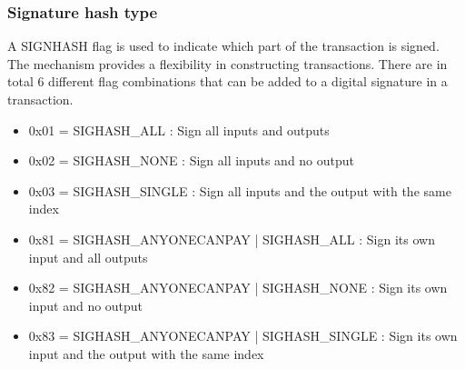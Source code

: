 \subsubsection{Signature hash type}

A SIGNHASH \cite{website:signhash} flag is used to indicate which part of the transaction is signed. 
The mechanism provides a flexibility in constructing transactions. 
There are in total 6 different flag combinations that can be added to a digital signature in a transaction. 

\begin{itemize}
    \item 0x01 = SIGHASH\_ALL : Sign all inputs and outputs
    \item 0x02 = SIGHASH\_NONE : Sign all inputs and no output
    \item 0x03 = SIGHASH\_SINGLE : Sign all inputs and the output with the same index
    \item 0x81 = SIGHASH\_ANYONECANPAY | SIGHASH\_ALL : Sign its own input and all outputs
    \item 0x82 = SIGHASH\_ANYONECANPAY | SIGHASH\_NONE : Sign its own input and no output
    \item 0x83 = SIGHASH\_ANYONECANPAY | SIGHASH\_SINGLE : Sign its own input and the output with the same index
\end{itemize}
